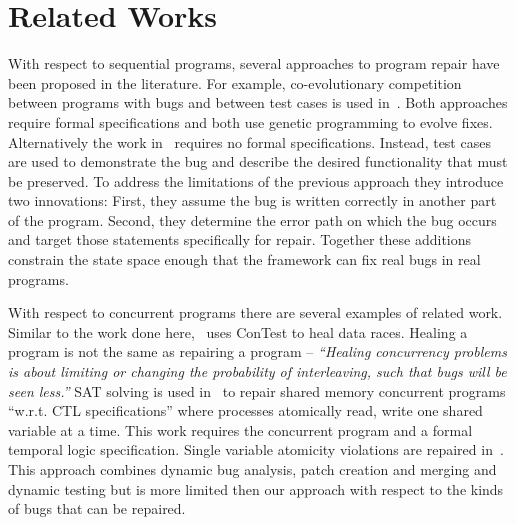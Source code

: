 \section{Related Works}
\label{sec:related_works}


With respect to sequential programs, several approaches to program repair have been proposed in the literature. For example, co-evolutionary competition between programs with bugs and between test cases is used
in~\cite{AY08, Arc08, WT10}. Both approaches require formal specifications and
both use genetic programming to evolve fixes. Alternatively the work in~\cite{FNWG09, WNLF09, NWLF09, WFGN10, GNFW11,
LDFW12} requires no formal specifications. Instead, test cases are used
to demonstrate the bug and describe the desired functionality that must be
preserved. To address the limitations of the previous approach they introduce
two innovations: First, they assume the bug is written correctly in another
part of the program. Second, they determine the error path on which the bug
occurs and target those statements specifically for repair. Together these
additions constrain the state space enough that the framework can fix real bugs
in real programs.

With respect to concurrent programs there are several examples of related work. Similar to the work done here,~\cite{KLT+07, LVK08} uses ConTest to heal data
races. Healing a program is not the same as repairing a program -- \textit{``Healing concurrency problems is about
limiting or changing the probability of interleaving, such that bugs will be
seen less.''} SAT solving is used in~\cite{AY07}  to repair shared memory concurrent programs
``w.r.t. CTL specifications'' where processes atomically read, write one shared
variable at a time. This work requires the concurrent program and a formal temporal logic
specification. Single variable atomicity violations are repaired in~\cite{JSZL+11}. This approach combines dynamic bug analysis, patch creation and merging and dynamic testing but is more limited then our approach with respect to the kinds of bugs that can be repaired.